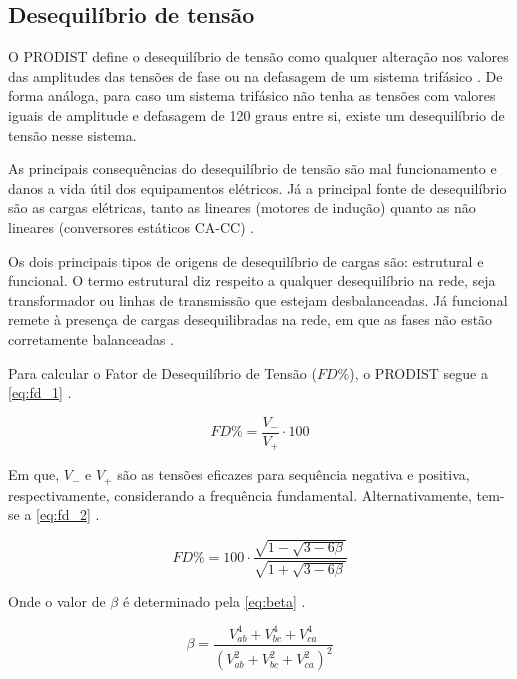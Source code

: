 \subsection{Desequilíbrio de tensão}

O PRODIST define o desequilíbrio de tensão como qualquer alteração nos valores das amplitudes das tensões de fase ou na defasagem de um sistema trifásico \cite{ref:ANEEL2021}. De forma análoga, para  caso um sistema trifásico não tenha as tensões com valores iguais de amplitude e defasagem de 120 graus entre si, existe um desequilíbrio de tensão nesse sistema.

As principais consequências do desequilíbrio de tensão são mal funcionamento e danos a vida útil dos equipamentos elétricos. Já a principal fonte de desequilíbrio são as cargas elétricas, tanto as lineares (motores de indução) quanto as não lineares (conversores estáticos CA-CC) \cite{ref:paulilo_2013}.

Os dois principais tipos de origens de desequilíbrio de cargas são: estrutural e funcional. O termo estrutural diz respeito a qualquer desequilíbrio na rede, seja transformador ou linhas de transmissão que estejam desbalanceadas. Já funcional remete à presença de cargas desequilibradas na rede, em que as fases não estão corretamente balanceadas \cite{ref:rezende_2012}.

Para calcular o Fator de Desequilíbrio de Tensão ($FD\%$), o PRODIST segue a \autoref{eq:fd_1} \cite{ref:ANEEL2021}.

\begin{equation}
  FD\% = \frac{V_-}{V_+}\cdot 100
  \label{eq:fd_1}
\end{equation}

Em que, $V_-$ e $V_+$ são as tensões eficazes para sequência negativa e positiva, respectivamente, considerando a frequência fundamental. Alternativamente, tem-se a \autoref{eq:fd_2} \cite{ref:ANEEL2021}.

\begin{equation}
  FD\%=100 \cdot \frac{\sqrt{1-\sqrt{3-6 \beta}}}{\sqrt{1+\sqrt{3-6 \beta}}}
  \label{eq:fd_2}
\end{equation}

Onde o valor de $\beta$ é determinado pela \autoref{eq:beta} \cite{ref:ANEEL2021}.

\begin{equation}  
  \beta=\frac{V_{a b}^4+V_{b c}^4+V_{c a}^4}{\left(V_{a b}^2+V_{b c}^2+V_{c a}^2\right)^2}
  \label{eq:beta}
\end{equation}

